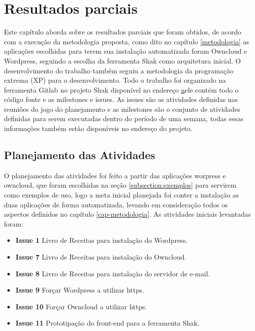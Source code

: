 \chapter{Resultados parciais}
\label{cap-resultados}

Este capítulo aborda sobre os resultados parciais que foram obtidos, de acordo
com a execução da metodologia proposta, como dito no capítulo \ref{metodologia}
as aplicações escolhidas para terem sua instalação automatizada foram Owncloud e
Wordpress, seguindo a escolha da ferramenta Shak como arquitetura inicial. O
desenvolvimento do trabalho também seguiu a metodologia da programação extrema
(XP) para o desenvolvimento. Todo o trabalho foi organizado na ferramenta Gitlab
no projeto Shak disponível no endereço \href{https://gitlab.com/Shak/Shak/} nele
contém todo o código fonte e as milestones e issues. As issues são as atividades
definidas nas reuniões do jogo do planejamento e as milestones são o conjunto de
atividades definidas para serem executadas dentro do período de uma semana, todas
essas informações também estão disponíveis no endereço do projeto.

\section{Planejamento das Atividades}

O planejamento das atividades foi feito a partir das aplicações worpress e owncloud,
que foram escolhidas na seção \ref{subsection:exemplos} para servirem como exemplos
de uso, logo a meta inicial planejada foi conter a instalação as duas aplicações
de forma automatizada, levando em consideração todos os aspectos definidos no capítulo
\ref{cap-metodologia}. As atividades iniciais levantadas foram:

 \begin{itemize}
   \item \textbf{Issue 1} Livro de Receitas para instalação do Wordpress.
   \item \textbf{Issue 7} Livro de Receitas para instalação do Owncloud.
   \item \textbf{Issue 8} Livro de Receitas para instalação do servidor de e-mail.
   \item \textbf{Issue 9} Forçar Wordpress a utilizar https.
   \item \textbf{Issue 10} Forçar Owncloud a utilizar https.
   \item \textbf{Issue 11} Prototipação do front-end para a ferramenta Shak.
 \end{itemize}

